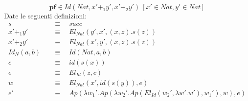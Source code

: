 \begin{displaymath}
    \textbf{pf} \in Id(Nat, x' +_1 y', x' +_2 y')\ [x' \in Nat, y' \in Nat]
\end{displaymath}
Date le seguenti definizioni:
\begin{align*}
    s\quad&\equiv\quad succ\\
    x' +_1 y' \quad&\equiv\quad El_{Nat} (y', x', (x, z).s(z))\\
    x' +_2 y' \quad&\equiv\quad El_{Nat} (x', y', (x, z).s(z))\\
    Id_N(a, b) \quad&\equiv\quad Id(Nat, a, b)\\
    c \quad&\equiv\quad id(s(x)) \\
    e \quad&\equiv\quad El_{Id}(z, c) \\
    w \quad&\equiv\quad El_{Nat} (x', id(s(y)), e) \\
    e' \quad&\equiv\quad Ap(\lambda w_1'. Ap(\lambda w_2'. Ap(El_{Id}(w_2', \lambda w'.w'), w_1'),w), e)
\end{align*}